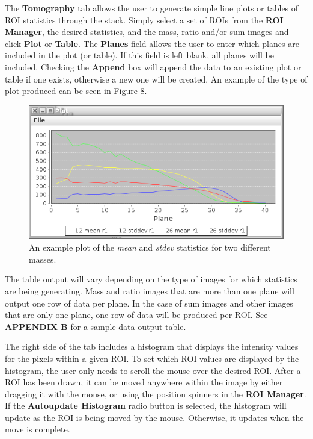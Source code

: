 \documentclass{article}
\begin{document}
	The \textbf{Tomography} tab allows the user to generate simple line plots or tables
	of ROI statistics through the stack. Simply select a set of ROIs from the 
	\textbf{ROI Manager}, the desired statistics, and the mass, ratio and/or sum  
	images and click \textbf{Plot} or \textbf{Table}.
	The \textbf{Planes} field allows the user to enter which planes are 
	included in the plot (or table). If this field is left blank, all planes will be 
	included. Checking the \textbf{Append} box will append the data to an existing
	plot or table if one exists, otherwise a new one will be created. An example of 
	the type of plot produced can be seen in Figure 8. 
	
   \begin{figure}[h!]
	\centering
	\includegraphics[scale=0.82]{snapshot_TomographyPlot2.png}
	\caption{An example plot of the \textit{mean} and \textit{stdev} statistics for two different masses.}
	\end{figure}

	The table output will vary depending on the type of images for which
	statistics are being generating. Mass and ratio images that are more
	than one plane will output one row of data per plane. In the case of
	sum images and other images that are only one plane, one row of data
	will be produced per ROI. See \textbf{APPENDIX B} for a sample data output table.
	
	The right side of the tab includes a histogram that displays the intensity values for 
	the pixels within a given ROI.
	To set which ROI values are displayed by the histogram, the user only needs to 
	scroll the mouse over the desired ROI. After a ROI has been drawn, it can be moved
	anywhere within the image by either dragging it with the mouse, or using the position
	spinners in the \textbf{ROI Manager}. If the \textbf{Autoupdate Histogram} radio 
	button is selected, the histogram will update as the ROI is being moved by the mouse.
	Otherwise, it updates when the move is complete.
\end{document}
